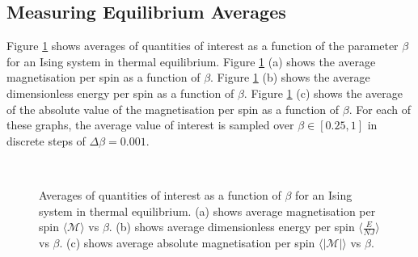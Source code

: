 \documentclass[11pt]{iopart}
\begin{document}
\subsection{Measuring Equilibrium Averages}

 Figure \ref{fig:equilibriumaverages} shows averages of quantities of interest as a function of the parameter $\beta$ for an Ising system in thermal equilibrium. Figure \ref{fig:equilibriumaverages} (a) shows the average magnetisation per spin as a function of $\beta$. Figure \ref{fig:equilibriumaverages} (b) shows the average dimensionless energy per spin as a function of $\beta$. Figure \ref{fig:equilibriumaverages} (c) shows the average of the absolute value of the magnetisation per spin as a function of $\beta$. For each of these graphs, the average value of interest is sampled over $\beta \in [0.25, 1]$ in discrete steps of $\Delta \beta = 0.001$.

\begin{figure}[t]
    \centering
    \quad
     \
 
    \caption{Averages of quantities of interest as a function of $\beta$ for an Ising system in thermal equilibrium. (a) shows average magnetisation per spin $\langle\mathcal{M}\rangle$ vs $\beta$. (b) shows average dimensionless energy per spin $\langle\frac{E}{NJ}\rangle$ vs $\beta$. (c) shows average absolute magnetisation per spin $\langle|\mathcal{M}|\rangle$ vs $\beta$.}
    \label{fig:equilibriumaverages}
\end{figure}
\end{document}
